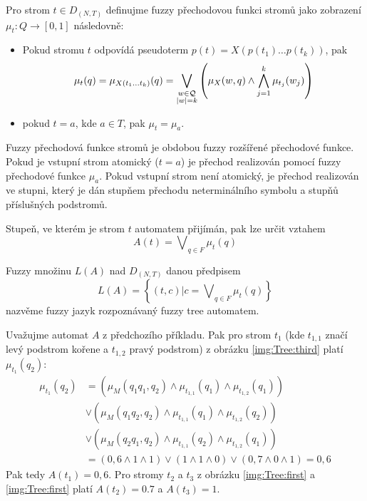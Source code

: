 \documentclass[a4paper,10pt]{article}
\begin{document}
\begin{definition}
 Pro strom $t \in D_{(N,T)}$ definujme fuzzy přechodovou funkci stromů jako zobrazení $\mu_t: Q \rightarrow [0,1]$ následovně:
 \begin{itemize}
  \item Pokud stromu $t$ odpovídá pseudoterm $p(t) = X(p(t_1) \dots p(t_k))$, pak 
  $$
    \mu_t(q) 
      = \mu_{X(t_1 \dots t_k)}(q) \\
      = \bigvee_{\substack{w \in \mathcal{Q} \\ |w| = k}} \left( \mu_X(w, q) \wedge \bigwedge_{j=1}^{k} \mu_{t_j}(w_j) \right)
  $$
  \item pokud $t = a$, kde $a \in T$, pak $\mu_t = \mu_a$. 
 \end{itemize}
\end{definition}

Fuzzy přechodová funkce stromů je obdobou fuzzy rozšířené přechodové funkce. Pokud je vstupní strom atomický ($t = a$) je přechod realizován pomocí fuzzy přechodové funkce $\mu_a$. Pokud vstupní strom není atomický, je přechod realizován ve stupni, který je dán stupňem přechodu neterminálního symbolu a stupňů příslušných podstromů.

Stupeň, ve kterém je strom $t$ automatem přijímán, pak lze určit vztahem
$$
 A(t) = \bigvee\nolimits_{q \in F} \mu_t(q)
$$

\begin{definition}
 Fuzzy množinu $L(A)$ nad $D_{(N,T)}$ danou předpisem
 $$
  L(A) = \left\{ (t, c) | c = \bigvee\nolimits_{q \in F} \mu_t(q) \right\}
 $$
 nazvěme fuzzy jazyk rozpoznávaný fuzzy tree automatem.
\end{definition}

\begin{example}
 Uvažujme automat $A$ z předchozího příkladu. Pak pro strom $t_1$ (kde $t_{1,1}$ značí levý podstrom kořene a $t_{1,2}$ pravý podstrom) z obrázku \ref{img:Tree:third} platí $\mu_{t_1}(q_2)$:
 \begin{align*}
  \mu_{t_1}(q_2) 
    &= 		\left( \mu_M(q_1 q_1, q_2) \wedge \mu_{t_{1,1}}(q_1) \wedge \mu_{t_{1,2}}(q_1) \right) \\
    &\vee 	\left( \mu_M(q_1 q_2, q_2) \wedge \mu_{t_{1,1}}(q_1) \wedge \mu_{t_{1,2}}(q_2) \right) \\ 
    &\vee 	\left( \mu_M(q_2 q_1, q_2) \wedge \mu_{t_{1,1}}(q_2) \wedge \mu_{t_{1,2}}(q_1) \right) \\ 
    &= \left( 0,6 \wedge 1 \wedge 1 \right) \vee \left( 1 \wedge 1 \wedge 0 \right) \vee \left( 0,7 \wedge 0 \wedge 1 \right) 
    = 0,6
 \end{align*}
 Pak tedy $A(t_1) = 0,6$. Pro stromy $t_2$ a $t_3$ z obrázku \ref{img:Tree:first} a \ref{img:Tree:first} platí $A(t_2) = 0.7$ a $A(t_3) = 1$.
\end{example}
\end{document}

